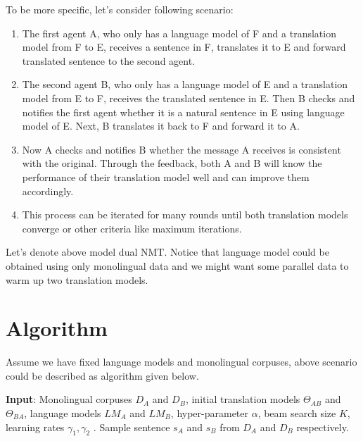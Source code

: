\documentclass[11pt]{article}
\begin{document}
{To be more specific, let's consider following scenario:
\begin{enumerate}[label*=\arabic*.]
\item The first agent A, who only has a language model of F and a translation model from F to E, receives a sentence in F, translates it to E and forward translated sentence to the second agent.

\item The second agent B, who only has a language model of E and a translation model from E to F, receives the translated sentence in E. Then B checks and notifies the first agent whether it is a natural sentence in E using language model of E. Next, B translates it back to F and forward it to A.

\item Now A checks and notifies B whether the message A receives is consistent with the original. Through the feedback, both A and B will know the performance of their translation model well and can improve them accordingly.

\item This process can be iterated for many rounds until both translation models converge or other criteria like maximum iterations.
\end{enumerate}
Let's denote above model dual NMT. Notice that language model could be obtained using only monolingual data and we might want some parallel data to warm up two translation models.
\part{Algorithm}
Assume we have fixed language models and monolingual corpuses, above scenario could be described as algorithm given below.
\begin{algorithm}
\begin{algorithmic}[1]
\State \textbf{Input}: Monolingual corpuses $D_A$ and $D_B$, initial translation models $\Theta_{AB}$ and $\Theta_{BA}$, language models $LM_A$ and $LM_B$, hyper-parameter $\alpha$, beam search size $K$, learning rates $\gamma_1,\gamma_2$ .
\Repeat
\State Sample sentence $s_A$ and $s_B$ from $D_A$ and $ D_B$ respectively.


\end{algorithmic}
\end{algorithm}}
\end{document}
